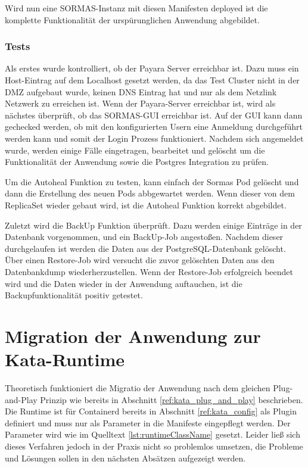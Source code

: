 Wird nun eine \ac{SORMAS}-Instanz mit diesen Manifesten deployed ist die komplette Funktionalität der urspürunglichen Anwendung abgebildet.

\subsubsection{Tests}
\label{ref:tests}
Als erstes wurde kontrolliert, ob der Payara Server erreichbar ist.
Dazu muss ein Host-Eintrag auf dem Localhost gesetzt werden, da das Test Cluster nicht in der \ac{DMZ} aufgebaut wurde, keinen \ac{DNS} Eintrag hat und nur als dem Netzlink Netzwerk zu erreichen ist. 
Wenn der Payara-Server erreichbar ist, wird als nächstes überprüft, ob das \ac{SORMAS}-\ac{GUI} erreichbar ist.
Auf der \ac{GUI} kann dann gechecked werden, ob mit den konfigurierten Usern eine Anmeldung durchgeführt werden kann und somit der Login Prozess funktioniert.
Nachdem sich angemeldet wurde, werden einige Fälle eingetragen, bearbeitet und gelöscht um die Funktionalität der Anwendung sowie die Postgres Integration zu prüfen.

Um die Autoheal Funktion zu testen, kann einfach der Sormas Pod gelöscht und dann die Erstellung des neuen Pods abbgewartet werden.
Wenn dieser von dem ReplicaSet wieder gebaut wird, ist die Autoheal Funktion korrekt abgebildet.

Zuletzt wird die BackUp Funktion überprüft.
Dazu werden einige Einträge in der Datenbank vorgenommen, und ein BackUp-Job angestoßen. 
Nachdem dieser durchgelaufen ist werden die Daten aus der PostgreSQL-Datenbank gelöscht.
Über einen Restore-Job wird versucht die zuvor gelöschten Daten aus den Datenbankdump wiederherzustellen. 
Wenn der Restore-Job erfolgreich beendet wird und die Daten wieder in der Anwendung auftauchen, ist die Backupfunktionalität positiv getestet.


\section{Migration der Anwendung zur Kata-Runtime}
Theoretisch funktioniert die Migratio der Anwendung nach dem gleichen Plug-and-Play Prinzip wie bereits in Abschnitt \ref{ref:kata_plug_and_play} beschrieben.
Die Runtime ist für Containerd bereits in Abschnitt \ref{ref:kata_config} als Plugin definiert und muss nur als Parameter in die Manifeste eingepflegt werden.
Der Parameter wird wie im Quelltext \ref{lst:runtimeClassName} gesetzt.
Leider ließ sich dieses Verfahren jedoch in der Praxis nicht so problemlos umsetzen, die Probleme und Lösungen sollen in den nächsten Absätzen aufgezeigt werden. 


